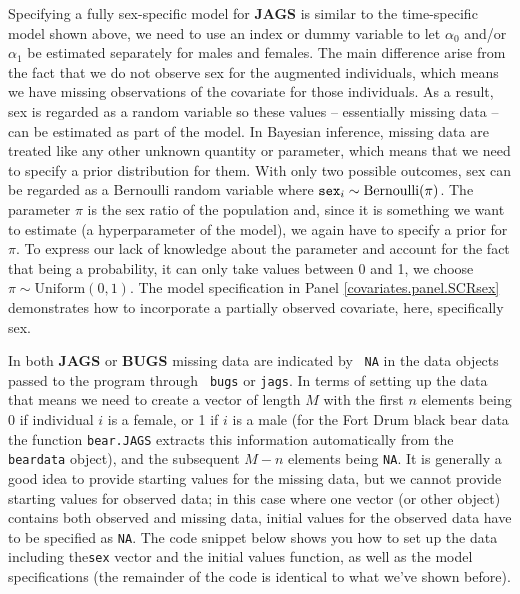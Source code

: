 Specifying a fully sex-specific model for {\bf JAGS} is similar to the
time-specific model shown above, we need to use an index or dummy
variable to let $\alpha_0$ and/or $\alpha_1$ be estimated separately
for males and females. The main difference arise from the fact that we
do not observe sex for the augmented individuals, which means we have
missing observations of the covariate for those individuals. As a
result, sex is regarded as a random variable so these values --
essentially missing data -- can be estimated as part of the model. In
Bayesian inference, missing data are treated like any other unknown
quantity or parameter, 
 which means that we need to specify a prior distribution for them.
 With only two possible outcomes, sex can be
regarded as a Bernoulli random variable where $\mbox{\tt sex}_{i} \sim
\mbox{Bernoulli}(\pi)$.
 The parameter $\pi$ is the sex
ratio of the population and, since it is something we want to estimate
(a hyperparameter of the model), we again have to specify a prior for
$\pi$. To express our lack of knowledge about the parameter and
account for the fact that being a probability, it can only take values
between 0 and 1, we choose $\pi \sim \mbox{Uniform}(0,1)$.  The model
specification in Panel \ref{covariates.panel.SCRsex} demonstrates how
to incorporate a partially observed covariate, here, specifically sex.

In both {\bf JAGS} or {\bf BUGS} missing data are indicated by  {\tt
  NA} in the data objects passed to the program through \mbox{\tt
  bugs} or \mbox{\tt jags}. In terms of setting up the data that means we need to create a
vector of length $M$ with the first $n$ elements being 0 if individual
$i$ is a female, or 1 if $i$ is a male (for the Fort Drum black bear
data the function {\tt bear.JAGS} extracts this information
automatically from the {\tt beardata} object), and the subsequent
$M-n$ elements being {\tt NA}.  It is generally a good idea to provide
starting values for the missing data, but we cannot provide starting
values for observed data; in this case where one vector (or other
object) contains both observed and missing data, initial values for
the observed data have to be specified as {\tt NA}.  The code snippet
below shows you how to set up the data including the{\tt sex} vector
and the initial values function, as well as the {\jags} model
specifications (the remainder of the code is identical to what we've
shown before).


